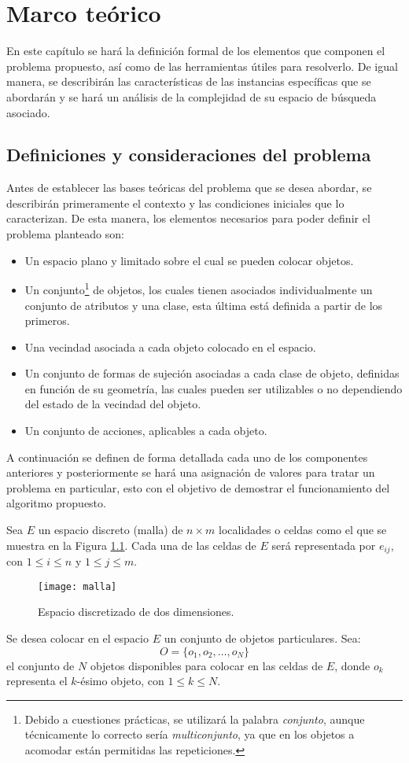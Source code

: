 \chapter{Marco teórico}
\label{chap:marco_teorico}
%
%
En este capítulo se hará la definición formal de los elementos que componen el problema propuesto, así como de las herramientas útiles para resolverlo.
De igual manera, se describirán las características de las instancias específicas que se abordarán y se hará un análisis de la complejidad de su espacio de búsqueda asociado.
%
%
\section{Definiciones y consideraciones del problema}
\label{sec:definiciones_y_consideraciones}
%
%
Antes de establecer las bases teóricas del problema que se desea abordar, se describirán primeramente el contexto y las condiciones iniciales que lo caracterizan.
De esta manera, los elementos necesarios para poder definir el problema planteado son: 
%
\begin{itemize}
	\item Un espacio plano y limitado sobre el cual se pueden colocar objetos.
	\item Un conjunto\footnote{Debido a cuestiones prácticas, se utilizará la palabra \textsl{conjunto}, aunque técnicamente lo correcto sería \textsl{multiconjunto}, ya que en los objetos a acomodar están permitidas las repeticiones.} de objetos, los cuales tienen asociados individualmente un conjunto de atributos y una clase, esta última está definida a partir de los primeros.
	\item Una vecindad asociada a cada objeto colocado en el espacio.
	\item Un conjunto de formas de sujeción asociadas a cada clase de objeto, definidas en función de su geometría, las cuales  pueden ser utilizables o no dependiendo del estado de la vecindad del objeto.
	\item Un conjunto de acciones, aplicables a cada objeto.
\end{itemize}
%
A continuación se definen de forma detallada cada uno de los componentes anteriores y posteriormente se hará una asignación de valores para tratar un problema en particular, esto con el objetivo de demostrar el funcionamiento del algoritmo propuesto.

Sea $E$ un espacio discreto (malla) de $n\times m$ localidades o celdas como el que se muestra en la Figura \ref{fig:malla}.
Cada una de las celdas de $E$ será representada por $e_{ij}$, con $1 \leq i \leq n$ y $1 \leq j \leq m$.
%
\begin{figure}[H]
	\texttt{[image: malla]}%
	\caption{Espacio discretizado de dos dimensiones.}%
	\label{fig:malla}%
\end{figure}
%
Se desea colocar en el espacio $E$ un conjunto de objetos particulares.
Sea:
%
\begin{equation}
\label{eq:objetos}
O = \{ o_1, o_2, \ldots, o_N \}
\end{equation}
%
el conjunto de $N$ objetos disponibles para colocar en las celdas de $E$, donde $o_k$ representa el $k$-ésimo objeto, con $1 \leq k \leq N$.


